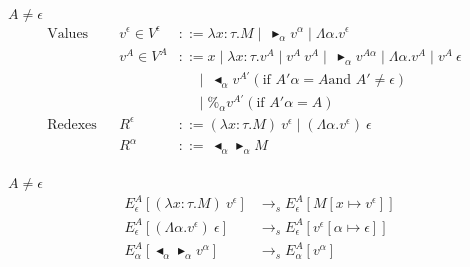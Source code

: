 \documentclass[runningheads]{llncs}
\newcommand{\TB}{\blacktriangleright}
\newcommand{\TBL}{\blacktriangleleft}
\begin{document}
\begin{definition}[Values]
$A \neq \epsilon$\\
\begin{align*}
    \textrm{Values} && v^\epsilon \in V^\epsilon & ::= \lambda x:\tau.M \mid\ \TB_\alpha v^\alpha \mid \Lambda\alpha.v^\epsilon & \\
                    && v^A \in V^A & ::= x \mid \lambda x:\tau.v^A \mid v^A\ v^A \mid\ \TB_\alpha v^{A\alpha} 
                                           \mid \Lambda\alpha.v^A \mid v^A\ \epsilon &\\
                                    &&& \quad\   \mid\ \TBL_\alpha v^{A'} (\text{if } A'\alpha = A \text{and } A' \neq \epsilon) & \\
                                    &&& \quad\   \mid \%_\alpha v^{A'} (\text{if } A'\alpha = A) & \\
    \textrm{Redexes} && R^\epsilon & ::= (\lambda x:\tau.M)\ v^\epsilon \mid (\Lambda\alpha.v^\epsilon)\ \epsilon & \\
                     && R^\alpha & ::=\ \TBL_\alpha \TB_\alpha M & \\
\end{align*}
\end{definition}


\begin{definition}
$A \neq \epsilon$\\
\begin{align*}
    E^A_\epsilon [(\lambda x:\tau.M)\ v^\epsilon] & \longrightarrow_s E^A_\epsilon[M[x\mapsto v^\epsilon]] \\
    E^A_\epsilon [(\Lambda\alpha.v^\epsilon)\ \epsilon] & \longrightarrow_s E^A_\epsilon[v^\epsilon[\alpha\mapsto \epsilon]] \\
    E^A_\alpha [\TBL_\alpha \TB_\alpha v^\alpha] & \longrightarrow_s E^A_\alpha[v^\alpha] \\
\end{align*}
\end{definition}
\end{document}
